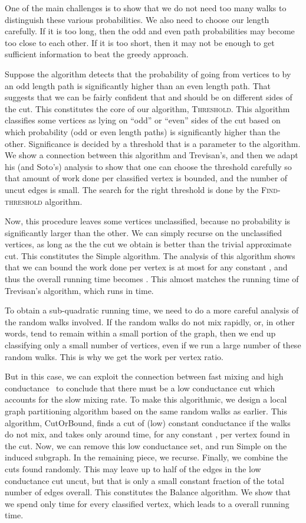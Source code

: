 \documentclass[11pt]{article}
\newcommand\Balance{{\sc Balance}\xspace}
\newcommand\Threshold{\textsc{Threshold}\xspace}
\newcommand\Find{\textsc{Find-threshold}\xspace}
\newcommand\Simple{{\sc Simple}\xspace}
\newcommand\CutOrBound{{\sc CutOrBound}\xspace}
\begin{document}
One of the main challenges is to show that we do not
need too many walks to distinguish these various
probabilities. We also need to choose our length
carefully. If it is too long, then the odd and even path
probabilities may become too close to each other.
If it is too short, then it may not be enough to
get sufficient information to beat the greedy
approach.


Suppose the algorithm detects that the probability of going from vertices  to  by an odd length path is significantly higher than an even length path. That suggests that we can be fairly confident that  and  should be on different sides of the cut.
This constitutes the core of our algorithm, \Threshold. This algorithm classifies some vertices as lying on ``odd'' or ``even'' sides of the cut based on which probability (odd or even length paths) is significantly higher than the other.  Significance is decided by a threshold that is a parameter to the algorithm. We show a connection between this algorithm and Trevisan's, and then we adapt his (and Soto's) analysis to show that one can choose the threshold carefully so that amount of work done per classified vertex is bounded, and the number of uncut edges is small. The search for the right threshold is done by the \Find algorithm.

Now, this procedure leaves some vertices unclassified, because no probability is significantly larger than the other. We can simply recurse on the unclassified vertices, as long as the the cut we obtain is better than the trivial  approximate cut. This constitutes the \Simple algorithm. The analysis of this algorithm shows that we can bound the work done per vertex is at most  for any constant , and thus the overall running time becomes . This almost matches the running time of Trevisan's algorithm, which runs in  time.


To obtain a sub-quadratic running time, we need to do a more careful analysis of the random walks involved. If the random walks do not mix rapidly, or, in other words, tend to remain within a small portion of the graph, then we end up classifying only a small number of vertices, even if we run a large number of these random walks. This is why we get the  work per vertex ratio.

But in this case, we can exploit the connection between fast mixing and high conductance~\cite{sinclair, M89, LS90} to conclude that there must be a low conductance cut which accounts for the slow mixing rate. To make this algorithmic, we design a local graph partitioning algorithm based on the same random walks as earlier. This algorithm, \CutOrBound, finds a cut of (low) constant conductance if the walks do not mix, and takes only around  time, for any constant , per vertex found in the cut. Now, we can remove this low conductance set, and run \Simple on
the induced subgraph. In the remaining piece, we recurse. Finally, we combine the cuts found randomly.
This may leave up to half of the edges in the low conductance cut uncut, but that is only a small constant fraction of the total number of edges overall. This constitutes the \Balance algorithm. We show that we spend only  time for every classified vertex, which leads to a  overall running time.
\end{document}
